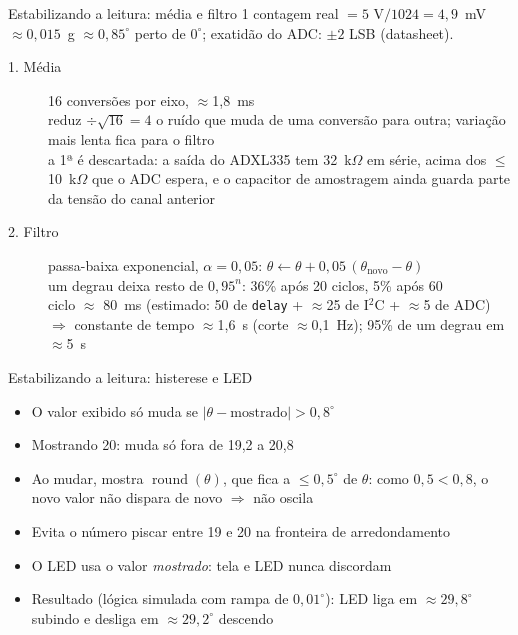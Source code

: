 \documentclass[aspectratio=169]{beamer}
\begin{document}
\begin{frame}{Estabilizando a leitura: média e filtro}
\small
1 contagem real $= 5\text{~V}/1024 = 4{,}9$~mV $\approx 0{,}015$~g $\approx 0{,}85^\circ$ perto de $0^\circ$;
exatidão do ADC: $\pm2$ LSB (datasheet).
\begin{description}
  \item[1. Média] 16 conversões por eixo, $\approx$1,8~ms
    \\ reduz $\div\sqrt{16}=4$ o ruído que muda de uma conversão para outra; variação mais lenta fica para o filtro
    \\ a 1ª é descartada: a saída do ADXL335 tem 32~k$\Omega$ em série, acima dos $\le$10~k$\Omega$ que o ADC espera,
    e o capacitor de amostragem ainda guarda parte da tensão do canal anterior
  \item[2. Filtro] passa-baixa exponencial, $\alpha = 0{,}05$:
    \quad $\theta \leftarrow \theta + 0{,}05\,(\theta_\text{novo}-\theta)$
    \\ um degrau deixa resto de $0{,}95^n$: 36\% após 20 ciclos, 5\% após 60
    \\ ciclo $\approx$ 80~ms (estimado: 50 de \texttt{delay} + $\approx$25 de I$^2$C + $\approx$5 de ADC)
    \\ $\Rightarrow$ constante de tempo $\approx$1,6~s (corte $\approx$0,1~Hz); 95\% de um degrau em $\approx$5~s
\end{description}
\end{frame}

\begin{frame}{Estabilizando a leitura: histerese e LED}
\begin{itemize}
  \item O valor exibido só muda se $|\theta - \text{mostrado}| > 0{,}8^\circ$
  \item Mostrando 20: muda só fora de 19,2 a 20,8
  \item Ao mudar, mostra $\operatorname{round}(\theta)$, que fica a $\le0{,}5^\circ$ de $\theta$:
    como $0{,}5 < 0{,}8$, o novo valor não dispara de novo $\Rightarrow$ não oscila
  \item Evita o número piscar entre 19 e 20 na fronteira de arredondamento
  \item O LED usa o valor \emph{mostrado}: tela e LED nunca discordam
  \item Resultado (lógica simulada com rampa de $0{,}01^\circ$):
    LED liga em $\approx29{,}8^\circ$ subindo e desliga em $\approx29{,}2^\circ$ descendo
\end{itemize}
\end{frame}
\end{document}
